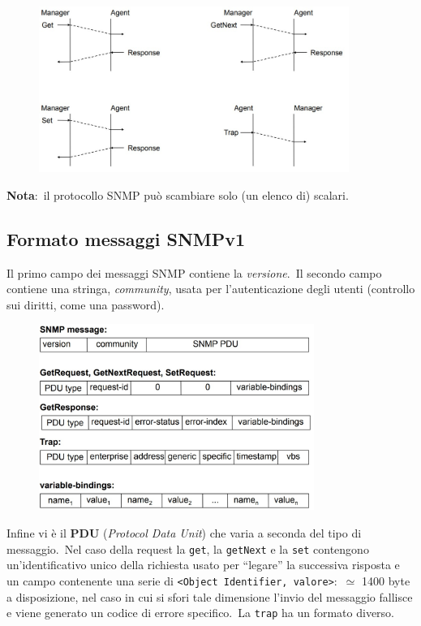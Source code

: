 \begin{figure}[H]
    \centering
    \includegraphics[width=0.9\textwidth]{immagini/SNMP_operations.jpg}
\end{figure}

\noindent\textbf{Nota}:\ il protocollo SNMP può scambiare solo (un elenco di) scalari.

\subsection{Formato messaggi SNMPv1}

Il primo campo dei messaggi SNMP contiene la \textit{versione}.\
Il secondo campo contiene una stringa, \textit{community}, usata per l'autenticazione degli utenti (controllo sui diritti, come una password).

\begin{figure}[H]
    \centering
    \includegraphics[width=0.8\textwidth]{immagini/SNMP_messageFormat.jpg}
\end{figure}

\noindent Infine vi è il \textbf{PDU} (\textit{Protocol Data Unit}) che varia a seconda del tipo di messaggio.\ Nel caso della request la \texttt{get}, la \texttt{getNext} e la \texttt{set} contengono un'identificativo unico della richiesta usato per ``legare'' la successiva risposta e un campo contenente una serie di \verb|<Object Identifier, valore>|:\ $\simeq$ 1400 byte a disposizione, nel caso in cui si sfori tale dimensione l'invio del messaggio fallisce e viene generato un codice di errore specifico.\ La \texttt{trap} ha un formato diverso.\

